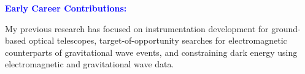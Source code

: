 \documentclass[11pt]{article}
\newcommand{\statement}[1]{\par\medskip
  \textcolor{blue}{\textbf{#1:}}%
}
\begin{document}
\statement{Early Career Contributions}
My previous research has focused on instrumentation development for ground-based optical telescopes, target-of-opportunity searches for electromagnetic counterparts of gravitational wave events, and constraining dark energy using electromagnetic and gravitational wave data.
\end{document}
